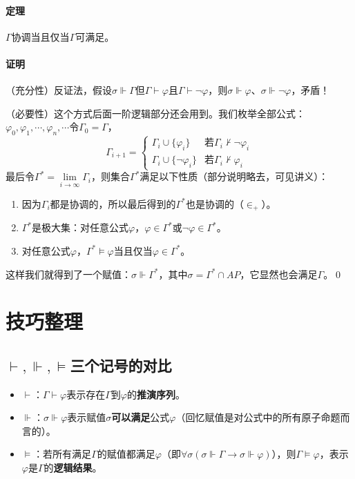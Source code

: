 \documentclass[b5paper,oneside]{ctexbook}
\begin{document}
\paragraph{定理}$\Gamma$协调当且仅当$\Gamma$可满足。
\paragraph{证明}（充分性）反证法，假设$\sigma\Vdash\Gamma$但$\Gamma\vdash\varphi$且$\Gamma\vdash\neg\varphi$，则$\sigma\Vdash\varphi$、$\sigma\Vdash\neg\varphi$，矛盾！

（必要性）这个方式后面一阶逻辑部分还会用到。我们枚举全部公式：$\varphi_0,\varphi_1,\cdots ,\varphi_n,\cdots$令$\Gamma_0=\Gamma$，
\[\Gamma_{i+1}=\begin{cases}
\Gamma_i\cup\{\varphi_i\}&\text{若}\Gamma_i\not\vdash\neg\varphi_i
\\\Gamma_i\cup\{\neg\varphi_i\}&\text{若}\Gamma_i\not\vdash\varphi_i
\end{cases}\]
最后令$\Gamma^*=\lim\limits_{i\to\infty}\Gamma_i$，则集合$\Gamma^*$满足以下性质（部分说明略去，可见讲义）：
\begin{enumerate}
\item 因为$\Gamma_i$都是协调的，所以最后得到的$\Gamma^*$也是协调的（$\in_+$）。
\item $\Gamma^*$是极大集：对任意公式$\varphi$，$\varphi\in\Gamma^*$或$\neg\varphi\in\Gamma^*$。
\item 对任意公式$\varphi$，$\Gamma^*\models\varphi$当且仅当$\varphi\in\Gamma^*$。
\end{enumerate}
这样我们就得到了一个赋值：$\sigma\Vdash\Gamma^*$，其中$\sigma=\Gamma^*\cap AP$，它显然也会满足$\Gamma$。\hfill\qed
\section{技巧整理}
\subsection{$\vdash,\Vdash,\models$三个记号的对比}
\begin{itemize}
\item $\vdash$：$\Gamma\vdash\varphi$表示存在$\Gamma$到$\varphi$的\textbf{推演序列}。
\item $\Vdash$：$\sigma\Vdash\varphi$表示赋值$\sigma$\textbf{可以满足}公式$\varphi$（回忆赋值是对公式中的所有原子命题而言的）。
\item $\models$：若所有满足$\Gamma$的赋值都满足$\varphi$（即$\forall\sigma (\sigma\Vdash\Gamma\rightarrow\sigma\Vdash\varphi)$），则$\Gamma\models\varphi$，表示$\varphi$是$\Gamma$的\textbf{逻辑结果}。
\end{itemize}
\end{document}
